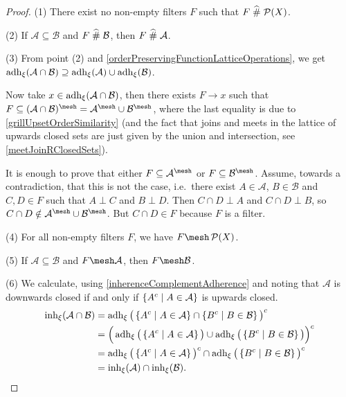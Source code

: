 \begin{proof}
(1) There exist no non-empty filters $F$ such that $F\mathrel{\widehat{\#}} \operatorname{\mathcal{P}}(X)$.

(2) If $\mathcal{A} \subseteq \mathcal{B}$ and $F\mathrel{\widehat{\#}} \mathcal{B}$, then $F\mathrel{\widehat{\#}} \mathcal{A}$.

(3) From point (2) and \ref{orderPreservingFunctionLatticeOperations}, we get $\operatorname{adh}_\xi(\mathcal{A}\cap \mathcal{B}) \supseteq \operatorname{adh}_\xi(\mathcal{A}) \cup \operatorname{adh}_\xi(\mathcal{B})$.

Now take $x\in\operatorname{adh}_\xi(\mathcal{A}\cap \mathcal{B})$, then there exists $F\to x$ such that $F\subseteq (\mathcal{A}\cap \mathcal{B})^\mesh = \mathcal{A}^\mesh\cup \mathcal{B}^\mesh$, where the last equality is due to \ref{grillUpsetOrderSimilarity} (and the fact that joins and meets in the lattice of upwards closed sets are just given by the union and intersection, see \ref{meetJoinRClosedSets}).

It is enough to prove that either $F\subseteq \mathcal{A}^\mesh$ or $F\subseteq \mathcal{B}^\mesh$. Assume, towards a contradiction, that this is not the case, i.e.\ there exist $A\in\mathcal{A}$, $B\in \mathcal{B}$ and $C,D\in F$ such that $A\perp C$ and $B\perp D$. Then $C\cap D\perp A$ and $C\cap D \perp B$, so $C\cap D \notin \mathcal{A}^\mesh\cup \mathcal{B}^\mesh$. But $C\cap D \in F$ because $F$ is a filter.

(4) For all non-empty filters $F$, we have $F\mesh \powerset(X)$.

(5) If $\mathcal{A} \subseteq \mathcal{B}$ and $F\mesh \mathcal{A}$, then $F\mesh \mathcal{B}$.

(6) We calculate, using \ref{inherenceComplementAdherence} and noting that $\mathcal{A}$ is downwards closed if and only if $\left\{ A^c \;\middle|\; A\in\mathcal{A} \right\}$ is upwards closed.
\begin{align*}
\operatorname{inh}_\xi(\mathcal{A}\cap \mathcal{B}) &= \operatorname{adh}_\xi\big(\left\{ A^c \;\middle|\; A\in\mathcal{A} \right\}\cap \left\{ B^c \;\middle|\; B\in\mathcal{B} \right\}\big)^c \\
&= \Big(\operatorname{adh}_\xi\big(\left\{ A^c \;\middle|\; A\in\mathcal{A} \right\}\big)\cup \operatorname{adh}_\xi\big(\left\{ B^c \;\middle|\; B\in\mathcal{B} \right\}\big)\Big)^c \\
&= \operatorname{adh}_\xi\big(\left\{ A^c \;\middle|\; A\in\mathcal{A} \right\}\big)^c\cap \operatorname{adh}_\xi\big(\left\{ B^c \;\middle|\; B\in\mathcal{B} \right\}\big)^c \\
&= \operatorname{inh}_\xi(\mathcal{A})\cap \operatorname{inh}_\xi(\mathcal{B}).
\end{align*}
\end{proof}
